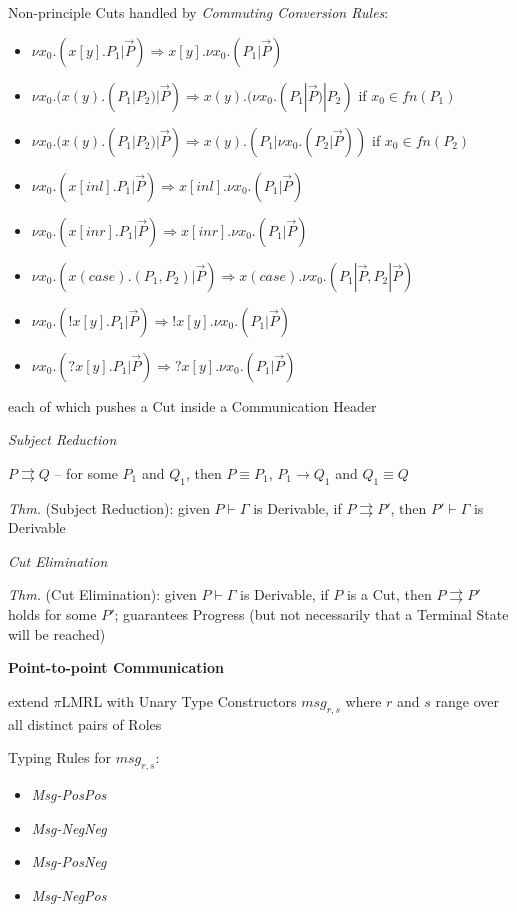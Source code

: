 Non-principle Cuts handled by \emph{Commuting Conversion Rules}:
\begin{itemize}
  \item $\nu x_0.(x[y].P_1|\vec{P})
    \Rightarrow x[y].\nu x_0.(P_1|\vec{P})$
  \item $\nu x_0.(x(y).(P_1|P_2)|\vec{P})
    \Rightarrow x(y).(\nu x_0.(P_1|\vec{P})|P_2)$ if $x_0 \in fn(P_1)$
  \item $\nu x_0.(x(y).(P_1|P_2)|\vec{P})
    \Rightarrow x(y).(P_1|\nu x_0.(P_2|\vec{P}))$ if $x_0 \in fn(P_2)$
  \item $\nu x_0.(x[inl].P_1|\vec{P})
    \Rightarrow x[inl].\nu x_0.(P_1|\vec{P})$
  \item $\nu x_0.(x[inr].P_1|\vec{P})
    \Rightarrow x[inr].\nu x_0.(P_1|\vec{P})$
  \item $\nu x_0.(x(case).(P_1,P_2)|\vec{P})
    \Rightarrow x(case).\nu x_0.(P_1|\vec{P}, P_2|\vec{P})$
  \item $\nu x_0.(!x[y].P_1|\vec{P})
    \Rightarrow !x[y].\nu x_0.(P_1|\vec{P})$
  \item $\nu x_0.(?x[y].P_1|\vec{P})
    \Rightarrow ?x[y].\nu x_0.(P_1|\vec{P})$
\end{itemize}
each of which pushes a Cut inside a Communication Header


\emph{Subject Reduction}

$P \rightrightarrows Q$ -- for some $P_1$ and $Q_1$, then $P \equiv
P_1$, $P_1 \rightarrow Q_1$ and $Q_1 \equiv Q$

\emph{Thm.} (Subject Reduction): given $P \vdash \Gamma$ is Derivable,
if $P \rightrightarrows P'$, then $P' \vdash \Gamma$ is Derivable


\emph{Cut Elimination}

\emph{Thm.} (Cut Elimination): given $P \vdash \Gamma$ is Derivable,
if $P$ is a Cut, then $P \rightrightarrows P'$ holds for some $P'$;
guarantees Progress (but not necessarily that a Terminal State will be
reached)


\textbf{Point-to-point Communication}

extend $\pi$LMRL with Unary Type Constructors $msg_{r,s}$ where $r$
and $s$ range over all distinct pairs of Roles

Typing Rules for $msg_{r,s}$:
\begin{itemize}
  \item \emph{Msg-PosPos}
  \item \emph{Msg-NegNeg}
  \item \emph{Msg-PosNeg}
  \item \emph{Msg-NegPos}
\end{itemize}



